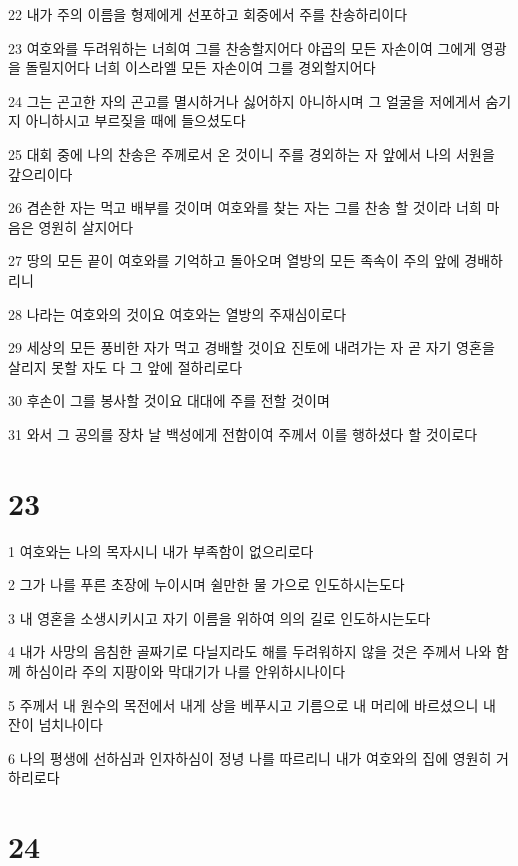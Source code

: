 \par 22 내가 주의 이름을 형제에게 선포하고 회중에서 주를 찬송하리이다
\par 23 여호와를 두려워하는 너희여 그를 찬송할지어다 야곱의 모든 자손이여 그에게 영광을 돌릴지어다 너희 이스라엘 모든 자손이여 그를 경외할지어다
\par 24 그는 곤고한 자의 곤고를 멸시하거나 싫어하지 아니하시며 그 얼굴을 저에게서 숨기지 아니하시고 부르짖을 때에 들으셨도다
\par 25 대회 중에 나의 찬송은 주께로서 온 것이니 주를 경외하는 자 앞에서 나의 서원을 갚으리이다
\par 26 겸손한 자는 먹고 배부를 것이며 여호와를 찾는 자는 그를 찬송 할 것이라 너희 마음은 영원히 살지어다
\par 27 땅의 모든 끝이 여호와를 기억하고 돌아오며 열방의 모든 족속이 주의 앞에 경배하리니
\par 28 나라는 여호와의 것이요 여호와는 열방의 주재심이로다
\par 29 세상의 모든 풍비한 자가 먹고 경배할 것이요 진토에 내려가는 자 곧 자기 영혼을 살리지 못할 자도 다 그 앞에 절하리로다
\par 30 후손이 그를 봉사할 것이요 대대에 주를 전할 것이며
\par 31 와서 그 공의를 장차 날 백성에게 전함이여 주께서 이를 행하셨다 할 것이로다

\chapter{23}

\par 1 여호와는 나의 목자시니 내가 부족함이 없으리로다
\par 2 그가 나를 푸른 초장에 누이시며 쉴만한 물 가으로 인도하시는도다
\par 3 내 영혼을 소생시키시고 자기 이름을 위하여 의의 길로 인도하시는도다
\par 4 내가 사망의 음침한 골짜기로 다닐지라도 해를 두려워하지 않을 것은 주께서 나와 함께 하심이라 주의 지팡이와 막대기가 나를 안위하시나이다
\par 5 주께서 내 원수의 목전에서 내게 상을 베푸시고 기름으로 내 머리에 바르셨으니 내 잔이 넘치나이다
\par 6 나의 평생에 선하심과 인자하심이 정녕 나를 따르리니 내가 여호와의 집에 영원히 거하리로다

\chapter{24}

